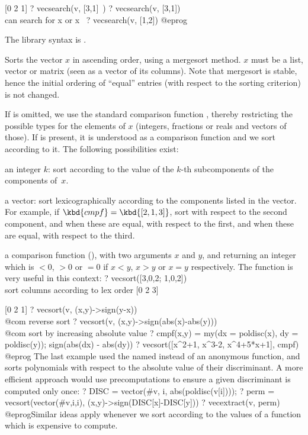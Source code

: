 [0 2 1]
? vecsearch(v, [3,1]~)
? vecsearch(v, [3,1])  \\ can search for x or x~
? vecsearch(v, [1,2])
@eprog\noindent

The library syntax is .

\label{se:vecsort}
Sorts the vector $x$ in ascending order, using a mergesort method.
$x$ must be a list, vector or matrix (seen as a vector of its columns).
Note that mergesort is stable, hence the initial ordering of ``equal''
entries (with respect to the sorting criterion) is not changed.

If  is omitted, we use the standard comparison function
, thereby restricting the possible types for the elements of $x$
(integers, fractions or reals and vectors of those). If  is
present, it is understood as a comparison function and we sort according to
it. The following possibilities exist:

\item an integer $k$: sort according to the value of the $k$-th
subcomponents of the components of~$x$.

\item a vector: sort lexicographically according to the components listed in
the vector. For example, if $\kbd{cmpf}=\kbd{[2,1,3]}$, sort with respect to
the second component, and when these are equal, with respect to the first,
and when these are equal, with respect to the third.

\item a comparison function (), with two arguments $x$ and $y$,
and returning an integer which is $<0$, $>0$ or $=0$ if $x<y$, $x>y$ or
$x=y$ respectively. The  function is very useful in this context:
\bprog
? vecsort([3,0,2; 1,0,2]) \\ sort columns according to lex order
[0 2 3]

[0 2 1]
? vecsort(v, (x,y)->sign(y-x))            \\@com reverse sort
? vecsort(v, (x,y)->sign(abs(x)-abs(y)))  \\@com sort by increasing absolute value
? cmpf(x,y) = my(dx = poldisc(x), dy = poldisc(y)); sign(abs(dx) - abs(dy))
? vecsort([x^2+1, x^3-2, x^4+5*x+1], cmpf)
@eprog\noindent
The last example used the named  instead of an anonymous function,
and sorts polynomials with respect to the absolute value of their
discriminant. A more efficient approach would use precomputations to ensure
a given discriminant is computed only once:
\bprog
? DISC = vector(#v, i, abs(poldisc(v[i])));
? perm = vecsort(vector(#v,i,i), (x,y)->sign(DISC[x]-DISC[y]))
? vecextract(v, perm)
@eprog\noindent Similar ideas apply whenever we sort according to the values
of a function which is expensive to compute.

